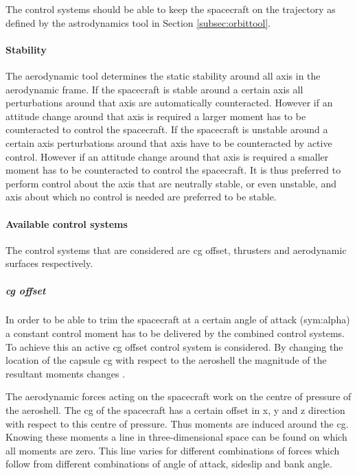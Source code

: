 The control systems should be able to keep the spacecraft on the trajectory as defined by the astrodynamics tool in Section \ref{subsec:orbittool}.

%

\paragraph{Stability}
\label{control:stab}

The aerodynamic tool determines the static stability around all axis in the aerodynamic frame. If the spacecraft is stable around a certain axis all perturbations around that axis are automatically counteracted. However if an attitude change around that axis is required a larger moment has to be counteracted to control the spacecraft.  If the spacecraft is unstable around a certain axis perturbations around that axis have to be counteracted by active control. However if an attitude change around that axis is required a smaller moment has to be counteracted to control the spacecraft. It is thus preferred to perform control about the axis that are neutrally stable, or even unstable, and axis about which no control is needed are preferred to be stable.

\paragraph{Available control systems}
\label{control:system}

The control systems that are considered are \gls{cg} offset, thrusters and aerodynamic surfaces respectively.

\subparagraph{\acrlong{cg} offset}

In order to be able to trim the spacecraft at a certain angle of attack (\gls{sym:alpha}) a constant control moment has to be delivered by the combined control systems. To achieve this an active \gls{cg} offset control system is considered. By changing the location of the capsule \gls{cg} with respect to the aeroshell the magnitude of the resultant moments changes \cite{Mulqueen1991}. 

The aerodynamic forces acting on the spacecraft work on the centre of pressure of the aeroshell. The \gls{cg} of the spacecraft has a certain offset in x, y and z direction with respect to this centre of pressure. Thus moments are induced around the \gls{cg}. Knowing these moments a line in three-dimensional space can be found on which all moments are zero. This line varies for different combinations of forces which follow from different combinations of angle of attack, sideslip and bank angle.

